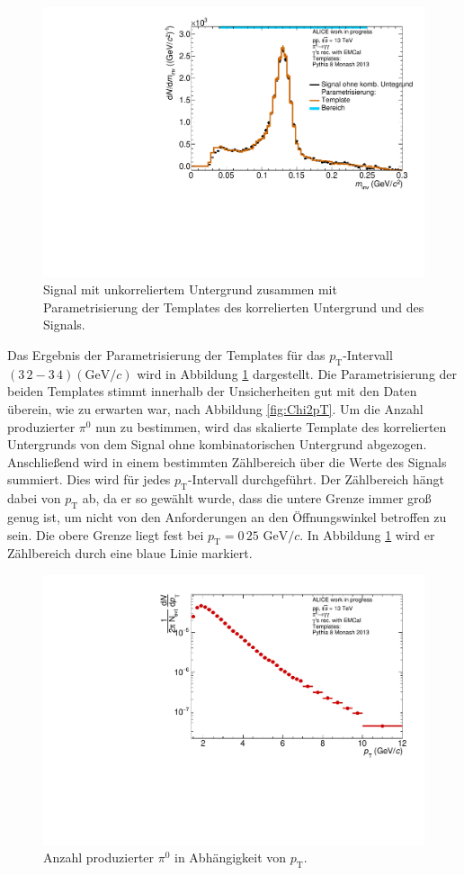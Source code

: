 \begin{figure}[tp]
\centering
\includegraphics[width=.65\linewidth]{ParamResult_Bin10_Data_2016.pdf}
\caption{Signal mit unkorreliertem Untergrund zusammen mit Parametrisierung der Templates des korrelierten Untergrund und des Signals.
}
\label{fig:ParamResult}
\end{figure}
Das Ergebnis der Parametrisierung der Templates für das $p_\text{T}$-Intervall $(3\,2-3\,4)(\text{GeV/}c)$ wird in Abbildung \ref{fig:ParamResult} dargestellt.
Die Parametrisierung der beiden Templates stimmt innerhalb der Unsicherheiten gut mit den Daten überein, wie zu erwarten war, nach Abbildung \ref{fig:Chi2pT}.
\newline
Um die Anzahl produzierter $\pi^{0}$ nun zu bestimmen, wird das skalierte Template des korrelierten Untergrunds von dem Signal ohne kombinatorischen Untergrund abgezogen.
Anschließend wird in einem bestimmten Zählbereich über die Werte des Signals summiert.
Dies wird für jedes $p_\text{T}$-Intervall durchgeführt.
\newline
Der Zählbereich hängt dabei von $p_\text{T}$ ab, da er so gewählt wurde, dass die untere Grenze immer groß genug ist, um nicht von den Anforderungen an den Öffnungswinkel betroffen zu sein.
Die obere Grenze liegt fest bei $p_\text{T} = 0\,25 \text{ GeV}/c$.
In Abbildung \ref{fig:ParamResult} wird er Zählbereich durch eine blaue Linie markiert.
\begin{figure}[tp]
\centering
\includegraphics[width=.65\linewidth]{UncorrYields_Data_2016.pdf}
\caption{Anzahl produzierter $\pi^{0}$ in Abhängigkeit von $p_\text{T}$.
}
\label{fig:RawYield}
\end{figure}
